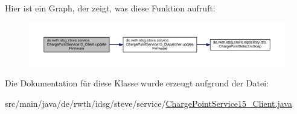 Hier ist ein Graph, der zeigt, was diese Funktion aufruft\-:\nopagebreak
\begin{figure}[H]
\begin{center}
\leavevmode
\includegraphics[width=350pt]{classde_1_1rwth_1_1idsg_1_1steve_1_1service_1_1_charge_point_service15___client_a7f17088a0c28a9bceb391df80a840be1_cgraph}
\end{center}
\end{figure}




Die Dokumentation für diese Klasse wurde erzeugt aufgrund der Datei\-:\begin{DoxyCompactItemize}
\item 
src/main/java/de/rwth/idsg/steve/service/\hyperlink{_charge_point_service15___client_8java}{Charge\-Point\-Service15\-\_\-\-Client.\-java}\end{DoxyCompactItemize}
